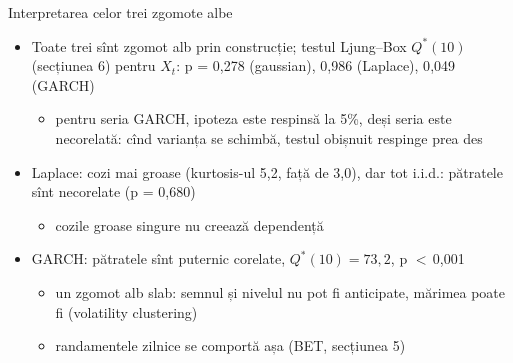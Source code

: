 \begin{frame}{Interpretarea celor trei zgomote albe}
\itemsize{\small}
\begin{itemize}
    \item Toate trei sînt zgomot alb prin construcție; testul Ljung--Box $Q^*(10)$ (secțiunea 6) pentru $X_t$: p = 0{,}278 (gaussian), 0{,}986 (Laplace), 0{,}049 (GARCH)
    \begin{itemize}
        \item pentru seria GARCH, ipoteza este respinsă la 5\%, deși seria este necorelată: cînd varianța se schimbă, testul obișnuit respinge prea des
    \end{itemize}
    \item Laplace: cozi mai groase (kurtosis-ul 5{,}2, față de 3{,}0), dar tot i.i.d.: pătratele sînt necorelate (p = 0{,}680)
    \begin{itemize}
        \item cozile groase singure nu creează dependență
    \end{itemize}
    \item GARCH: pătratele sînt puternic corelate, $Q^*(10) = 73{,}2$, p $<$\,0{,}001
    \begin{itemize}
        \item un zgomot alb slab: semnul și nivelul nu pot fi anticipate, mărimea poate fi (volatility clustering)
        \item randamentele zilnice se comportă așa (BET, secțiunea 5)
    \end{itemize}
\end{itemize}
\end{frame}

